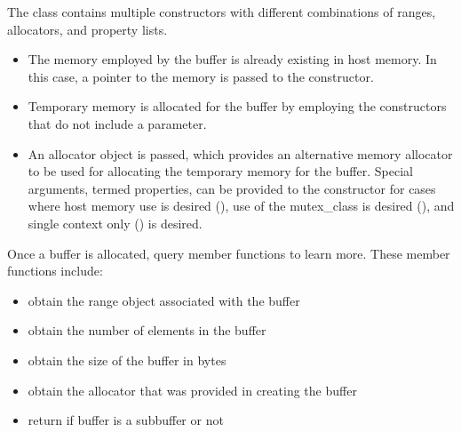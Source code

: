 \documentclass[letterpaper,10pt,english]{sphinxmanual}
\begin{document}
The class contains multiple constructors with different combinations of
ranges, allocators, and property lists.
\begin{itemize}
\item {} 
The memory employed by the buffer is already existing in host memory.
In this case, a pointer to the memory is passed to the constructor.

\item {} 
Temporary memory is allocated for the buffer by employing the
constructors that do not include a  parameter.

\item {} 
An allocator object is passed, which provides an alternative memory
allocator to be used for allocating the temporary memory for the
buffer. Special arguments, termed properties, can be provided to the
constructor for cases where host memory use is desired
(), use of the mutex\_class is desired
(), and single context only () is
desired.

\end{itemize}

Once a buffer is allocated, query member functions to learn more. These
member functions include:
\begin{itemize}
\item {} 
 \textendash{} obtain the range object associated with the buffer

\item {} 
 \textendash{} obtain the number of elements in the buffer

\item {} 
 \textendash{} obtain the size of the buffer in bytes

\item {} 
 \textendash{} obtain the allocator that was provided in
creating the buffer

\item {} 
 \textendash{} return if buffer is a sub\sphinxhyphen{}buffer or not

\end{itemize}
\end{document}
